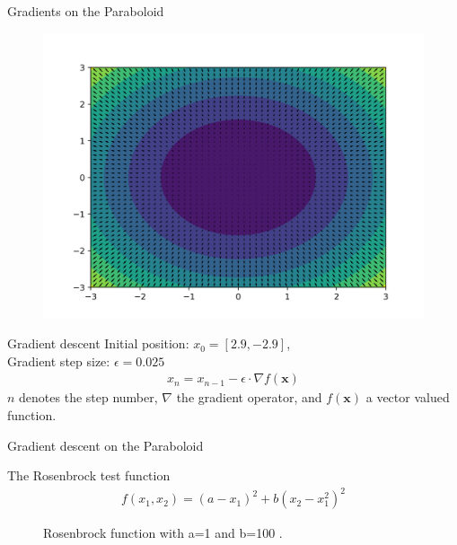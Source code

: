 \documentclass[notes]{beamer}
\begin{document}
    \begin{frame}{Gradients on the Paraboloid}
      \begin{figure}
        \includegraphics[width=.9\linewidth]{./figures/quiver_paraboloid.png}
      \end{figure}
    \end{frame}

    \begin{frame}{Gradient descent}
      Initial position: $x_0 = [2.9, -2.9]$, \\
      Gradient step size: $\epsilon = 0.025 $
      \begin{align}
        x_n = x_{n-1} - \epsilon \cdot \nabla f(\mathbf{x})
      \end{align}
      $n$ denotes the step number, $\nabla$ the gradient operator, and $f(\mathbf{x})$ a vector valued function.
    \end{frame}

    \begin{frame}{Gradient descent on the Paraboloid}
      \centering
    \end{frame}

    \begin{frame}{The Rosenbrock test function}
      \begin{align}
        f(x_1, x_2) = (a - x_1)^2 + b(x_2 - x_1^2)^2
      \end{align}
      \begin{figure}
        
        \caption{Rosenbrock function with a=1 and b=100 .}
      \end{figure}
    \end{frame}
\end{document}
